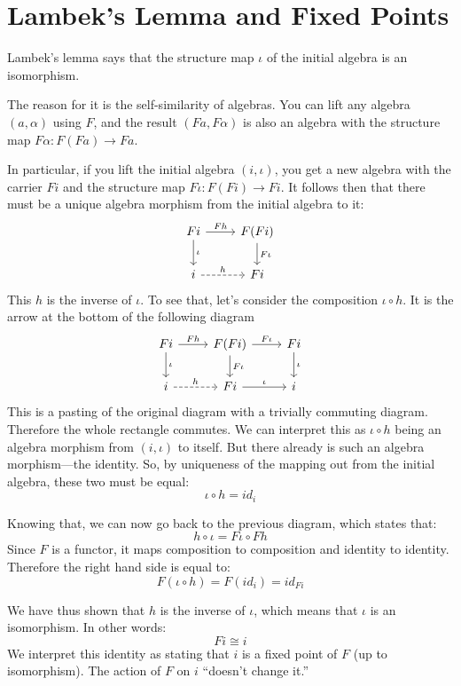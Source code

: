 \documentclass[DaoFP]{subfiles}
\begin{document}
\section{Lambek's Lemma and Fixed Points}


Lambek's lemma says that the structure map $\iota$ of the initial algebra is an isomorphism. 

The reason for it is the self-similarity of algebras. You can lift any algebra $(a, \alpha)$ using $F$, and the result $(F a, F \alpha)$ is also an algebra with the structure map $F \alpha \colon F (F a) \to F a$. 

In particular, if you lift the initial algebra $(i, \iota)$, you get a new algebra with the carrier $F i$ and the structure map $F \iota \colon F (F i) \to F i$. It follows then that there must be a unique algebra morphism from the initial algebra to it:
\[
 \begin{tikzcd}
 F i 
 \arrow[r, "F h"]
 \arrow[d, "\iota"]
 & F (F i)
\arrow[d, "F \iota"]
 \\
 i
 \arrow[r, dashed, "h"]
 & F i
  \end{tikzcd}
\]
This $h$ is the inverse of $\iota$. To see that, let's consider the composition $\iota \circ h$. It is the arrow at the bottom of the following diagram
\[
 \begin{tikzcd}
 F i 
 \arrow[r, "F h"]
 \arrow[d, "\iota"]
 & F (F i)
\arrow[d, "F \iota"]
\arrow[r, "F \iota"]
& F i
\arrow[d, "\iota"]
 \\
 i
 \arrow[r, dashed, "h"]
 & F i
 \arrow[r, "\iota"]
 & i
  \end{tikzcd}
\]
This is a pasting of the original diagram with a trivially commuting diagram. Therefore the whole rectangle commutes. We can interpret this as $\iota \circ h$ being an algebra morphism from $(i, \iota)$ to itself. But there already is such an algebra morphism---the identity. So, by uniqueness of the mapping out from the initial algebra, these two must be equal:
\[ \iota \circ h = id_i \] 

Knowing that, we can now go back to the previous diagram, which states that:
\[ h \circ \iota = F \iota \circ F h \]
Since $F$ is a functor, it maps composition to composition and identity to identity. Therefore the right hand side is equal to:
\[ F (\iota \circ h) = F (id_i) = id_{F i} \]

We have thus shown that $h$ is the inverse of $\iota$, which means that $\iota$ is an isomorphism. In other words:
\[ F i \cong i \]
We interpret this identity as stating that $i$ is a fixed point of $F$ (up to isomorphism). The action of $F$ on $i$ ``doesn't change it.''
\end{document}
